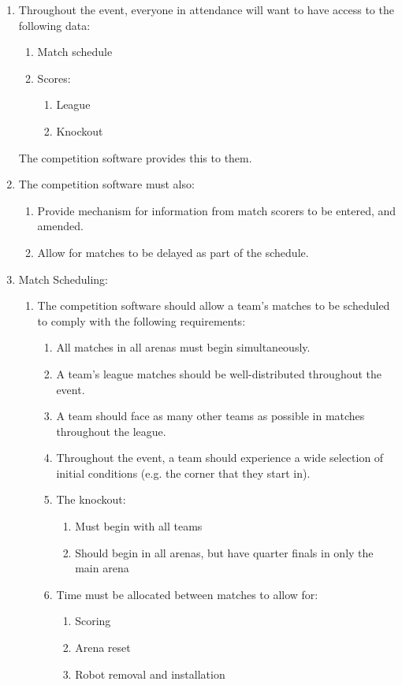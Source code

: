 \begin{enumerate}
\item Throughout the event, everyone in attendance will want to have access to the following data:
  \begin{enumerate}
  \item Match schedule
  \item Scores:
    \begin{enumerate}
    \item League
    \item Knockout
    \end{enumerate}
  \end{enumerate}
  The competition software provides this to them.

\item The competition software must also:
  \begin{enumerate}
  \item Provide mechanism for information from match scorers to be entered, and amended.
  \item Allow for matches to be delayed as part of the schedule.
  \end{enumerate}

\item Match Scheduling:
  \begin{enumerate}
  \item The competition software should allow a team's matches to be scheduled to comply with the following requirements:
    \begin{enumerate}
    \item All matches in all arenas must begin simultaneously.
    \item A team's league matches should be well-distributed throughout the event.
    \item A team should face as many other teams as possible in matches throughout the league.
    \item Throughout the event, a team should experience a wide selection of initial conditions (e.g. the corner that they start in).
    \item The knockout:
      \begin{enumerate}
      \item Must begin with all teams
      \item Should begin in all arenas, but have quarter finals in only the main arena
      \end{enumerate}
    \item Time must be allocated between matches to allow for:
      \begin{enumerate}
      \item Scoring
      \item Arena reset
      \item Robot removal and installation
      \end{enumerate}
    \end{enumerate}
  \end{enumerate}

\end{enumerate}







